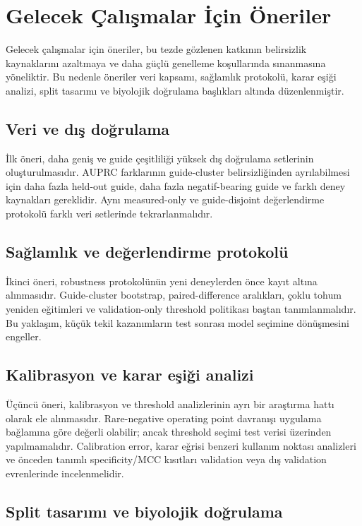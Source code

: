 \section{Gelecek Çalışmalar İçin Öneriler}

Gelecek çalışmalar için öneriler, bu tezde gözlenen katkının belirsizlik kaynaklarını azaltmaya ve daha güçlü genelleme koşullarında sınanmasına yöneliktir. Bu nedenle öneriler veri kapsamı, sağlamlık protokolü, karar eşiği analizi, split tasarımı ve biyolojik doğrulama başlıkları altında düzenlenmiştir.

\subsection{Veri ve dış doğrulama}

İlk öneri, daha geniş ve guide çeşitliliği yüksek dış doğrulama setlerinin oluşturulmasıdır. AUPRC farklarının guide-cluster belirsizliğinden ayrılabilmesi için daha fazla held-out guide, daha fazla negatif-bearing guide ve farklı deney kaynakları gereklidir. Aynı measured-only ve guide-disjoint değerlendirme protokolü farklı veri setlerinde tekrarlanmalıdır.

\subsection{Sağlamlık ve değerlendirme protokolü}

İkinci öneri, robustness protokolünün yeni deneylerden önce kayıt altına alınmasıdır. Guide-cluster bootstrap, paired-difference aralıkları, çoklu tohum yeniden eğitimleri ve validation-only threshold politikası baştan tanımlanmalıdır. Bu yaklaşım, küçük tekil kazanımların test sonrası model seçimine dönüşmesini engeller.

\subsection{Kalibrasyon ve karar eşiği analizi}

Üçüncü öneri, kalibrasyon ve threshold analizlerinin ayrı bir araştırma hattı olarak ele alınmasıdır. Rare-negative operating point davranışı uygulama bağlamına göre değerli olabilir; ancak threshold seçimi test verisi üzerinden yapılmamalıdır. Calibration error, karar eğrisi benzeri kullanım noktası analizleri ve önceden tanımlı specificity/MCC kısıtları validation veya dış validation evrenlerinde incelenmelidir.

\subsection{Split tasarımı ve biyolojik doğrulama}

